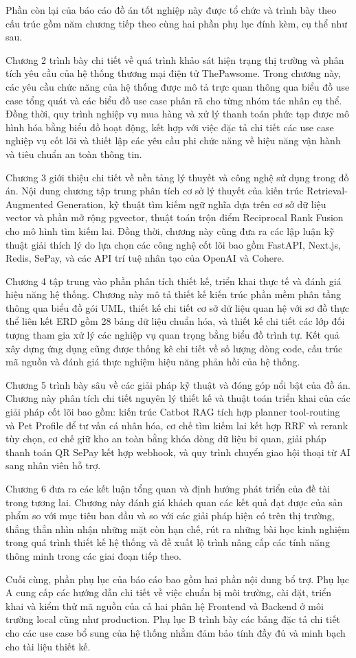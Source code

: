 \documentclass[../DoAn.tex]{subfiles}
\begin{document}
Phần còn lại của báo cáo đồ án tốt nghiệp này được tổ chức và trình bày theo cấu trúc gồm năm chương tiếp theo cùng hai phần phụ lục đính kèm, cụ thể như sau.

Chương 2 trình bày chi tiết về quá trình khảo sát hiện trạng thị trường và phân tích yêu cầu của hệ thống thương mại điện tử ThePawsome. Trong chương này, các yêu cầu chức năng của hệ thống được mô tả trực quan thông qua biểu đồ use case tổng quát và các biểu đồ use case phân rã cho từng nhóm tác nhân cụ thể. Đồng thời, quy trình nghiệp vụ mua hàng và xử lý thanh toán phức tạp được mô hình hóa bằng biểu đồ hoạt động, kết hợp với việc đặc tả chi tiết các use case nghiệp vụ cốt lõi và thiết lập các yêu cầu phi chức năng về hiệu năng vận hành và tiêu chuẩn an toàn thông tin.

Chương 3 giới thiệu chi tiết về nền tảng lý thuyết và công nghệ sử dụng trong đồ án. Nội dung chương tập trung phân tích cơ sở lý thuyết của kiến trúc Retrieval-Augmented Generation, kỹ thuật tìm kiếm ngữ nghĩa dựa trên cơ sở dữ liệu vector và phần mở rộng pgvector, thuật toán trộn điểm Reciprocal Rank Fusion cho mô hình tìm kiếm lai. Đồng thời, chương này cũng đưa ra các lập luận kỹ thuật giải thích lý do lựa chọn các công nghệ cốt lõi bao gồm FastAPI, Next.js, Redis, SePay, và các API trí tuệ nhân tạo của OpenAI và Cohere.

Chương 4 tập trung vào phần phân tích thiết kế, triển khai thực tế và đánh giá hiệu năng hệ thống. Chương này mô tả thiết kế kiến trúc phần mềm phân tầng thông qua biểu đồ gói UML, thiết kế chi tiết cơ sở dữ liệu quan hệ với sơ đồ thực thể liên kết ERD gồm 28 bảng dữ liệu chuẩn hóa, và thiết kế chi tiết các lớp đối tượng tham gia xử lý các nghiệp vụ quan trọng bằng biểu đồ trình tự. Kết quả xây dựng ứng dụng cũng được thống kê chi tiết về số lượng dòng code, cấu trúc mã nguồn và đánh giá thực nghiệm hiệu năng phản hồi của hệ thống.

Chương 5 trình bày sâu về các giải pháp kỹ thuật và đóng góp nổi bật của đồ án. Chương này phân tích chi tiết nguyên lý thiết kế và thuật toán triển khai của các giải pháp cốt lõi bao gồm: kiến trúc Catbot RAG tích hợp planner tool-routing và Pet Profile để tư vấn cá nhân hóa, cơ chế tìm kiếm lai kết hợp RRF và rerank tùy chọn, cơ chế giữ kho an toàn bằng khóa dòng dữ liệu bi quan, giải pháp thanh toán QR SePay kết hợp webhook, và quy trình chuyển giao hội thoại từ AI sang nhân viên hỗ trợ.

Chương 6 đưa ra các kết luận tổng quan và định hướng phát triển của đề tài trong tương lai. Chương này đánh giá khách quan các kết quả đạt được của sản phẩm so với mục tiêu ban đầu và so với các giải pháp hiện có trên thị trường, thẳng thắn nhìn nhận những mặt còn hạn chế, rút ra những bài học kinh nghiệm trong quá trình thiết kế hệ thống và đề xuất lộ trình nâng cấp các tính năng thông minh trong các giai đoạn tiếp theo.

Cuối cùng, phần phụ lục của báo cáo bao gồm hai phần nội dung bổ trợ. Phụ lục A cung cấp các hướng dẫn chi tiết về việc chuẩn bị môi trường, cài đặt, triển khai và kiểm thử mã nguồn của cả hai phân hệ Frontend và Backend ở môi trường local cũng như production. Phụ lục B trình bày các bảng đặc tả chi tiết cho các use case bổ sung của hệ thống nhằm đảm bảo tính đầy đủ và minh bạch cho tài liệu thiết kế.
\end{document}
